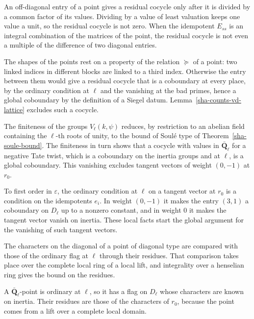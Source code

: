 An off-diagonal entry of a point gives a residual cocycle only after it is divided by a common factor of its values. Dividing by a value of least valuation keeps one value a unit, so the residual cocycle is not zero. When the idempotent $E_{ss}$ is an integral combination of the matrices of the point, the residual cocycle is not even a multiple of the difference of two diagonal entries.

The shapes of the points rest on a property of the relation $\succeq$ of a point: two linked indices in different blocks are linked to a third index. Otherwise the entry between them would give a residual cocycle that is a coboundary at every place, by the ordinary condition at $\ell$ and the vanishing at the bad primes, hence a global coboundary by the definition of a Siegel datum. Lemma~\ref{sha-counts-vd-lattice} excludes such a cocycle.

The finiteness of the groups $V_\ell(k,\psi)$ reduces, by restriction to an abelian field containing the $\ell$-th roots of unity, to the bound of Soulé type of Theorem~\ref{sha-soule-bound}. The finiteness in turn shows that a cocycle with values in $\bar{\mathbf Q}_\ell$ for a negative Tate twist, which is a coboundary on the inertia groups and at $\ell$, is a global coboundary. This vanishing excludes tangent vectors of weight $(0,-1)$ at $r_0$.

To first order in $\varepsilon$, the ordinary condition at $\ell$ on a tangent vector at $r_0$ is a condition on the idempotents $e_i$. In weight $(0,-1)$ it makes the entry $(3,1)$ a coboundary on $D_\ell$ up to a nonzero constant, and in weight $0$ it makes the tangent vector vanish on inertia. These local facts start the global argument for the vanishing of such tangent vectors.

The characters on the diagonal of a point of diagonal type are compared with those of the ordinary flag at $\ell$ through their residues. That comparison takes place over the complete local ring of a local lift, and integrality over a henselian ring gives the bound on the residues.

A $\bar{\mathbf Q}_\ell$-point is ordinary at $\ell$, so it has a flag on $D_\ell$ whose characters are known on inertia. Their residues are those of the characters of $r_0$, because the point comes from a lift over a complete local domain.

